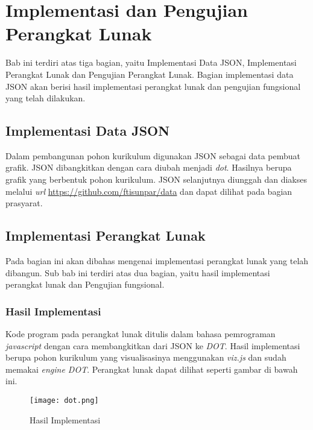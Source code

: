 \chapter{Implementasi dan Pengujian Perangkat Lunak}
\label{chap: Implementasi dan Pengujian Perangkat Lunak}

Bab ini terdiri atas tiga bagian, yaitu Implementasi Data JSON, Implementasi Perangkat Lunak dan Pengujian Perangkat Lunak. Bagian implementasi data JSON akan berisi hasil implementasi perangkat lunak dan pengujian fungsional yang telah dilakukan.

\section{Implementasi Data JSON}
\label{sec: Implementasi Data JSON}

Dalam pembangunan pohon kurikulum digunakan JSON sebagai data pembuat grafik. JSON dibangkitkan dengan cara diubah menjadi \textit{dot}. Hasilnya berupa grafik yang berbentuk pohon kurikulum. JSON selanjutnya diunggah dan diakses melalui \textit{url} \url{https://github.com/ftisunpar/data} dan dapat dilihat pada bagian prasyarat. 

\section{Implementasi Perangkat Lunak}
\label{sec: Implementasi Perangkat Lunak}

Pada bagian ini akan dibahas mengenai implementasi perangkat lunak yang telah dibangun. Sub bab ini terdiri atas dua bagian, yaitu hasil implementasi perangkat lunak dan Pengujian fungsional.

\subsection{Hasil Implementasi}
\label{sec: Hasil Implementasi}

Kode program pada perangkat lunak ditulis dalam bahasa pemrograman \textit{javascript} dengan cara membangkitkan dari JSON ke \textit{DOT}. Hasil implementasi berupa pohon kurikulum yang visualisasinya menggunakan \textit{viz.js} dan sudah memakai \textit{engine DOT}. Perangkat lunak dapat dilihat seperti gambar di bawah ini.

\begin{figure}[H]
		\texttt{[image: dot.png]}
		\caption{Hasil Implementasi}
		\label{fig: pohon kurikulum}
\end{figure}	 

